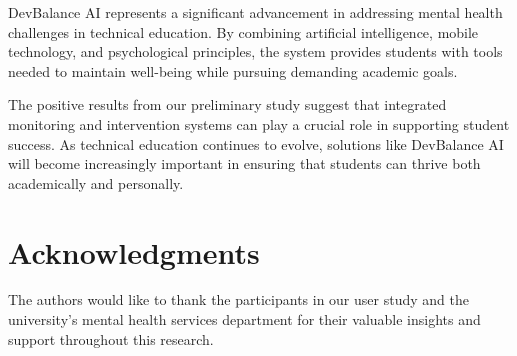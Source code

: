 \documentclass[conference,10pt]{IEEEtran}
\begin{document}
DevBalance AI represents a significant advancement in addressing mental health challenges in technical education. By combining artificial intelligence, mobile technology, and psychological principles, the system provides students with tools needed to maintain well-being while pursuing demanding academic goals.

The positive results from our preliminary study suggest that integrated monitoring and intervention systems can play a crucial role in supporting student success. As technical education continues to evolve, solutions like DevBalance AI will become increasingly important in ensuring that students can thrive both academically and personally.

\section*{Acknowledgments}

The authors would like to thank the participants in our user study and the university's mental health services department for their valuable insights and support throughout this research.
\end{document}
